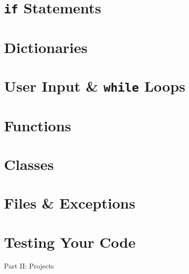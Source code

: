 \documentclass[oneside]{book}
\numberwithin{equation}{section}
\begin{document}

\section{\texttt{if} Statements}


\section{Dictionaries}


\section{User Input \& \texttt{while} Loops}


\section{Functions}


\section{Classes}


\section{Files \& Exceptions}


\section{Testing Your Code}


\begin{center}
	\huge Part II: Projects
\end{center}
\end{document}
